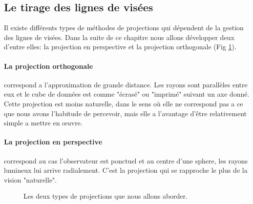 \subsection{Le tirage des lignes de visées}

Il existe différents types de méthodes de projections qui dépendent de la gestion des lignes de visées.
Dans la suite de ce chapitre nous allons développer deux d'entre elles: la projection en perspective et la projection orthogonale (Fig \ref{fig:raycast_projection}).

\paragraph{La projection orthogonale} correspond a l'approximation de grande distance.
Les rayons sont parallèles entre eux et le cube de données est comme "écrasé" ou "imprimé" suivant un axe donné.
Cette projection est moins naturelle, dans le sens où elle ne correspond pas a ce que nous avons l'habitude de percevoir, mais elle a l'avantage d'être relativement simple a mettre en œuvre.

\paragraph{La projection en perspective} correspond au cas l'observateur est ponctuel et au centre d'une sphere, les rayons lumineux lui arrive radialement.
C'est la projection qui se rapproche le plus de la vision "naturelle".

\begin{figure}[bth]
    \center
    \qquad
    \caption{Les deux types de projections que nous allons aborder.}
 	\label{fig:raycast_projection}
\end{figure}


